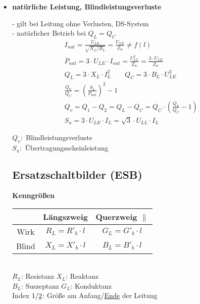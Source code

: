 \begin{itemize}
    \item[] \textbf{natürliche Leistung, Blindleistungsverluste}

        - gilt bei Leitung ohne Verlusten, DS-System\\
        - natürlicher Betrieb bei $Q_L = Q_C$
        \begin{gather*}
            I_{nat} = \frac{U_{LE}}{\sqrt{X_L/B_L}} =  \frac{U_{LE}}{Z_w} \neq f(l)\\
            P_{nat} = 3 \cdot U_{LE} \cdot I_{nat} = \frac{U^2_{LL}}{Z_w} = \frac{3 \cdot U_{LE}}{Z_w}\\
            Q_L = 3 \cdot X_L \cdot I_L^2 \qquad Q_C = 3 \cdot B_L \cdot U^2_{LE}\\
            \frac{Q_V}{Q_C} = \left(\frac{S_u}{P_{nat}} \right)^2-1\\
            Q_v = Q_1 - Q_2 = Q_L - Q_C = Q_C \cdot (\frac{Q_L}{Q_C}-1)\\
            S_u = 3 \cdot U_{LE} \cdot {I_L} = \sqrt{3} \cdot U_{LL} \cdot I_L
        \end{gather*}

        \indent $Q_v:$ Blindleistungsverluste\\
        \indent $S_u:$ Übertragungsscheinleistung

\subsection{Ersatzschaltbilder (ESB)}

\textbf{Kenngrößen}\\

\begin{tabular}[h]{c|c|c}
    & Längszweig & Querzweig $\parallel$ \\
    \hline
    Wirk & $R_L = R'_b \cdot l$ & $G_L= G'_b \cdot l$\\
    Blind & $X_L = X'_b \cdot l$ & $B_L = B'_b \cdot l$\\
\end{tabular}\\

$R_L$: Resistanz \qquad $X_L$: Reaktanz\\
$B_L$: Suszeptanz \qquad $G_L$: Konduktanz\\

Index $1/\underline{2}$: Größe am Anfang/\ul{Ende} der Leitung\\


\end{itemize}
